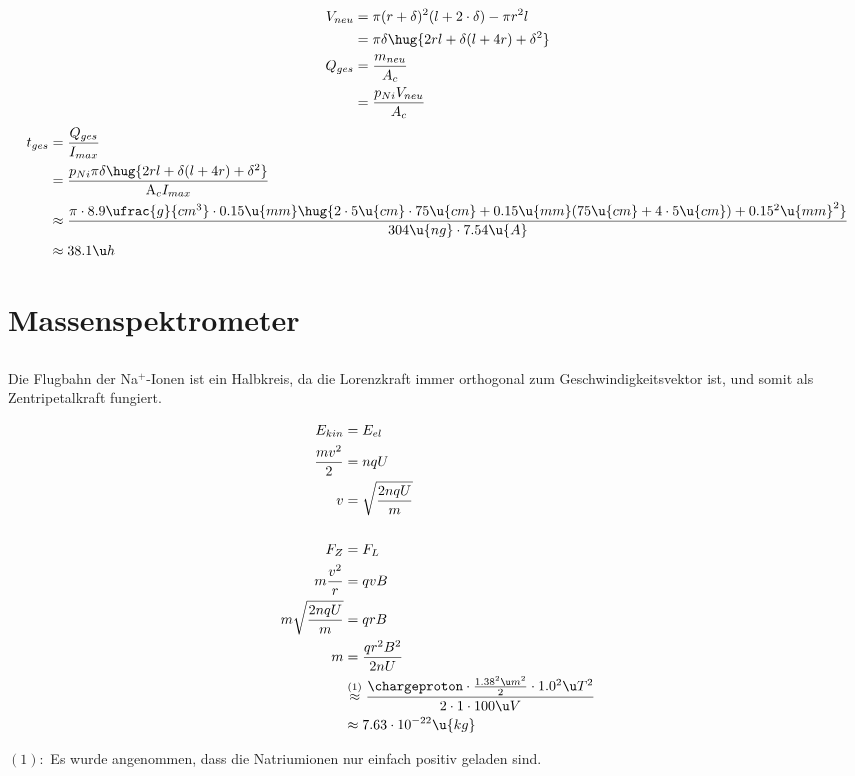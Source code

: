 \documentclass[11pt]{article}
\begin{document}
\subsection{}
\begin{align*}
    V_{neu} &= \pi (r+\delta)^2 (l+2\cdot \delta) - \pi r^2 l \\
    &= \pi \delta \hug{2 r l + \delta (l+4 r) + \delta^2}\\
    Q_{ges} &= \frac{m_{neu}}{A_c} \\
    &= \frac{p_{Ni}V_{neu}}{A_c}
\end{align*}
\begin{align*}
    t_{ges} &= \frac{Q_{ges}}{I_{max}}\\
    &= \frac{p_{Ni}\pi \delta \hug{2 r l + \delta (l+4 r) + \delta^2}}{\mathrm A_c I_{max}}\\
    &\approx \frac{\pi\cdot 8.9\ufrac{g}{cm^3} \cdot 0.15\u{mm} \hug{2 \cdot 5\u{cm} \cdot 75\u{cm} + 0.15\u{mm} (75\u{cm}+4 \cdot 5\u{cm}) 
    + 0.15^2\u{mm}^2}}{304 \u {ng}\cdot  7.54\u{A}}\\
    &\approx 38.1\u h
\end{align*}


\section{Massenspektrometer}
\subsection{}
\begin{adjustwidth}{20pt}{}
    Die Flugbahn der Na$^+$-Ionen ist ein Halbkreis, da die Lorenzkraft 
    immer orthogonal zum Geschwindigkeitsvektor ist, und somit
    als Zentripetalkraft fungiert.
\end{adjustwidth}
\begin{align*}
    E_{kin} &= E_{el}\\
    \frac{m v^2}{2} &= n q U\\
    v &= \sqrt{\frac{2 n q U}{m}}\\
    \\
    F_Z &= F_L\\
    m \frac{v^2}{r} &= q v B\\
    m \sqrt{\frac{2 n q U}{m}} &= q r B\\
    m  &= \frac{q r^2 B^2}{2 n U}\\
    &\overset{(1)}{\approx} \frac{\chargeproton \cdot \frac{1.38^2 \u m^2}{2}\cdot 1.0^2 \u T^2}{2\cdot 1\cdot 100 \u V}\\
    &\approx 7.63\cdot 10^{-22} \u{kg}
\end{align*}
\begin{adjustwidth}{20pt}{}
    $(1):$ Es wurde angenommen, dass die Natriumionen nur einfach positiv geladen sind.
\end{adjustwidth}
\end{document}
